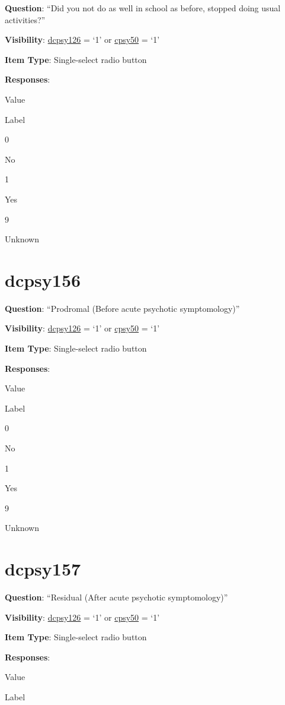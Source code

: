 \documentclass[]{book}
\begin{document}
\textbf{Question}: ``Did you not do as well in school as before, stopped doing usual activities?''

\textbf{Visibility}: \protect\hyperlink{dcpsy126}{dcpsy126} = `1' or \protect\hyperlink{cpsy50}{cpsy50} = `1'

\textbf{Item Type}: Single-select radio button

\textbf{Responses}:

Value

Label

0

No

1

Yes

9

Unknown

\hypertarget{dcpsy156}{%
\section{dcpsy156}\label{dcpsy156}}

\textbf{Question}: ``Prodromal (Before acute psychotic symptomology)''

\textbf{Visibility}: \protect\hyperlink{dcpsy126}{dcpsy126} = `1' or \protect\hyperlink{cpsy50}{cpsy50} = `1'

\textbf{Item Type}: Single-select radio button

\textbf{Responses}:

Value

Label

0

No

1

Yes

9

Unknown

\hypertarget{dcpsy157}{%
\section{dcpsy157}\label{dcpsy157}}

\textbf{Question}: ``Residual (After acute psychotic symptomology)''

\textbf{Visibility}: \protect\hyperlink{dcpsy126}{dcpsy126} = `1' or \protect\hyperlink{cpsy50}{cpsy50} = `1'

\textbf{Item Type}: Single-select radio button

\textbf{Responses}:

Value

Label
\end{document}
